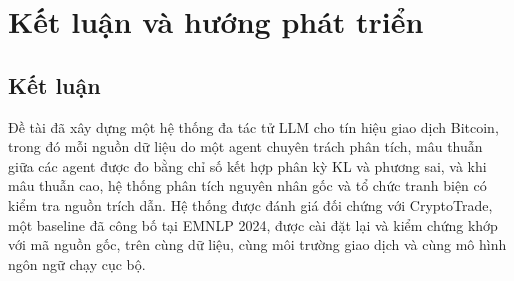 \chapter{Kết luận và hướng phát triển}
\label{chap:conclusion}

\section{Kết luận}
Đề tài đã xây dựng một hệ thống đa tác tử LLM cho tín hiệu giao dịch Bitcoin, trong đó mỗi nguồn dữ liệu do một agent
chuyên trách phân tích, mâu thuẫn giữa các agent được đo bằng chỉ số kết hợp phân kỳ KL và phương sai, và khi mâu thuẫn
cao, hệ thống phân tích nguyên nhân gốc và tổ chức tranh biện có kiểm tra nguồn trích dẫn. Hệ thống được đánh giá đối
chứng với CryptoTrade, một baseline đã công bố tại EMNLP 2024, được cài đặt lại và kiểm chứng khớp với mã nguồn gốc,
trên cùng dữ liệu, cùng môi trường giao dịch và cùng mô hình ngôn ngữ chạy cục bộ.

